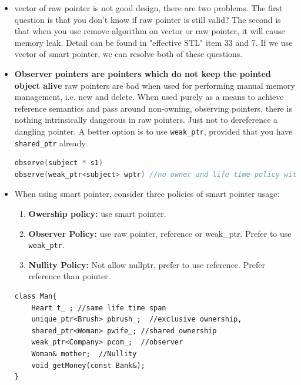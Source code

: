 \documentclass[a4paper,11pt,twoside]{book}
\begin{document}
\begin{itemize}
	\item vector of raw pointer is not good design, there are two problems. The first question is that you don't know if raw pointer is still valid? The second is that when you use remove algorithm on vector or raw pointer, it will cause memory leak. Detail can be found in "effective STL" item 33 and 7. If we use vector of smart pointer, we can resolve both of these questions.  

	\item \textbf{Observer pointers are pointers which do not keep the pointed object alive} raw pointers are bad when used for performing manual memory management, i.e. new and delete. When used purely as a means to achieve reference semantics and pass around non-owning, observing pointers, there is nothing intrinsically dangerous in raw pointers. Just not to dereference a dangling pointer. A better option is to use \texttt{weak\_ptr}, provided that you have \texttt{shared\_ptr} already.

\begin{lstlisting}[frame=single, language=c++]
observe(subject * s1)
observe(weak_ptr<subject> wptr) //no owner and life time policy with weak_ptr
\end{lstlisting}

\item When using smart pointer, consider three policies of smart pointer usage:
\begin{enumerate}
	\item \textbf{Owership policy:} use smart pointer.
	\item \textbf{Observer Policy:} use raw pointer, reference or weak\_ptr. Prefer to use \texttt{weak\_ptr}.
	\item \textbf{Nullity Policy:} Not allow nullptr, prefer to use reference. Prefer reference than pointer.
\end{enumerate}

\begin{lstlisting}
class Man{
	Heart t_ ; //same life time span
	unique_ptr<Brush> pbrush_;  //exclusive ownership, 
	shared_ptr<Woman> pwife_; //shared ownership
	weak_ptr<Company> pcom_;  //observer
	Woman& mother;  //Nullity
	void getMoney(const Bank&);
}	
\end{lstlisting}


\end{itemize}
\end{document}
